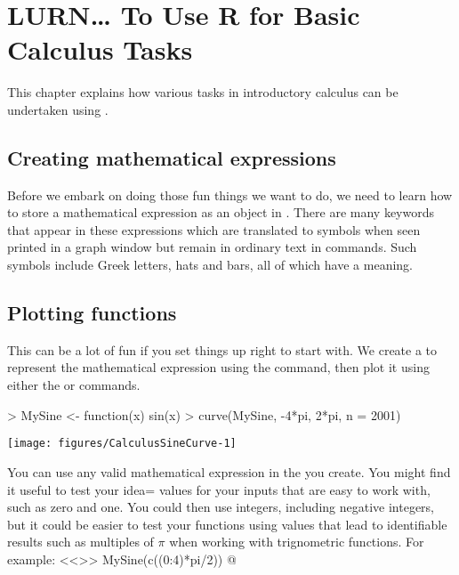 
\chapter{LURN\ldots{} To Use R for Basic Calculus Tasks}
\label{Calculus}



This chapter explains how various tasks in introductory calculus can be undertaken using \R{}.


\section{Creating mathematical expressions}

Before we embark on doing those fun things we want to do, we need to learn how to store a mathematical expression as an object in \R{}. There are many keywords that appear in these expressions which are translated to symbols when seen printed in a graph window but remain in ordinary text in \R{} commands. Such symbols include Greek letters, hats and bars, all of which have a meaning.

\section{Plotting functions}

This can be a lot of fun if you set things up right to start with. We create a  to represent the mathematical expression using the  command, then plot it using either the  or  commands.
\begin{Schunk}
\begin{Sinput}
> MySine <- function(x){ sin(x)}
> curve(MySine, -4*pi, 2*pi, n = 2001)
\end{Sinput}

\texttt{[image: figures/CalculusSineCurve-1]} \end{Schunk}

You can use any valid mathematical expression in the  you create. You might find it useful to test your idea= values for your inputs that are easy to work with, such as zero and one. You could then use integers, including negative integers, but  it could be easier to test your functions using values that lead to identifiable results such as multiples of $\pi$ when working with trignometric functions. For example:
<<>>
MySine(c((0:4)*pi/2))
@

